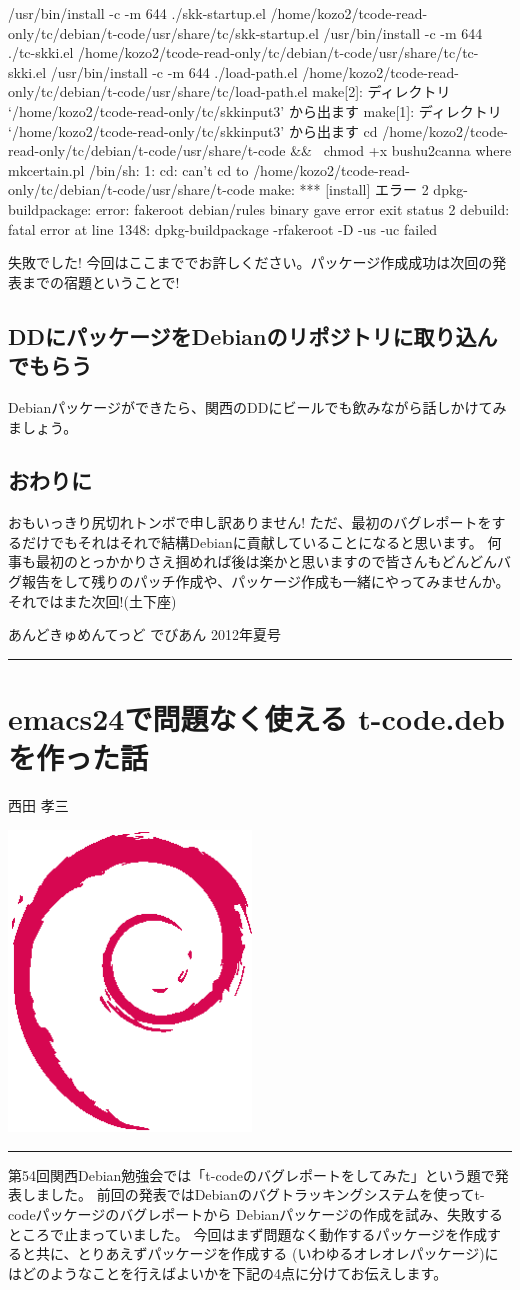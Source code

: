 \documentclass[mingoth,a4paper]{jsarticle}
\renewcommand{\dancersection}[2]{%
\newpage
あんどきゅめんてっど でびあん 2012年夏号
%
\vspace{0.1mm}\\
{\color{dancerdarkblue}\rule{\hsize}{2mm}}

%
%
\begin{minipage}[t]{0.6\hsize}
\color{dancerdarkblue}
\vspace{1cm}
\section{#1}
\hfill{}#2\\
\end{minipage}
\begin{minipage}[t]{0.4\hsize}
\vspace{-2cm}
\hfill{}\includegraphics[height=8cm]{image200502/openlogo-nd.eps}\\
\vspace{-5cm}
\end{minipage}
%
{\color{dancerlightblue}\rule{0.66\hsize}{2mm}}
%
\vspace{2cm}
}
\begin{document}
\begin{commandline}
 /usr/bin/install -c -m 644 ./skk-startup.el /home/kozo2/tcode-read-only/tc/debian/t-code/usr/share/tc/skk-startup.el
 /usr/bin/install -c -m 644 ./tc-skki.el /home/kozo2/tcode-read-only/tc/debian/t-code/usr/share/tc/tc-skki.el
 /usr/bin/install -c -m 644 ./load-path.el /home/kozo2/tcode-read-only/tc/debian/t-code/usr/share/tc/load-path.el
make[2]: ディレクトリ `/home/kozo2/tcode-read-only/tc/skkinput3' から出ます
make[1]: ディレクトリ `/home/kozo2/tcode-read-only/tc/skkinput3' から出ます
cd /home/kozo2/tcode-read-only/tc/debian/t-code/usr/share/t-code && \
                chmod +x bushu2canna where mkcertain.pl
/bin/sh: 1: cd: can't cd to /home/kozo2/tcode-read-only/tc/debian/t-code/usr/share/t-code
make: *** [install] エラー 2
dpkg-buildpackage: error: fakeroot debian/rules binary gave error exit status 2
debuild: fatal error at line 1348:
dpkg-buildpackage -rfakeroot -D -us -uc failed
\end{commandline}

失敗でした!
今回はここまででお許しください。パッケージ作成成功は次回の発表までの宿題ということで!

\subsection{DDにパッケージをDebianのリポジトリに取り込んでもらう}

Debianパッケージができたら、関西のDDにビールでも飲みながら話しかけてみましょう。

\subsection{おわりに}

おもいっきり尻切れトンボで申し訳ありません!
ただ、最初のバグレポートをするだけでもそれはそれで結構Debianに貢献していることになると思います。
何事も最初のとっかかりさえ掴めれば後は楽かと思いますので皆さんもどんどんバグ報告をして残りのパッチ作成や、パッケージ作成も一緒にやってみませんか。
それではまた次回!(土下座)

\dancersection{emacs24で問題なく使える t-code.deb を作った話}{西田 孝三}
\index{t-code}

第54回関西Debian勉強会では「t-codeのバグレポートをしてみた」という題で発表しました。
前回の発表ではDebianのバグトラッキングシステムを使ってt-codeパッケージのバグレポートから
Debianパッケージの作成を試み、失敗するところで止まっていました。
今回はまず問題なく動作するパッケージを作成すると共に、とりあえずパッケージを作成する
(いわゆるオレオレパッケージ)にはどのようなことを行えばよいかを下記の4点に分けてお伝えします。
\end{document}
